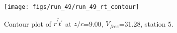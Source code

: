 \begin{figure}[H]
\centering
\texttt{[image: figs/run\_49/run\_49\_rt\_contour]}
\caption{Contour plot of $\overline{r^\prime t^\prime}$ at $z/c$=9.00, $V_{free}$=31.28, station 5.}
\label{fig:run_49_rt_contour}
\end{figure}


